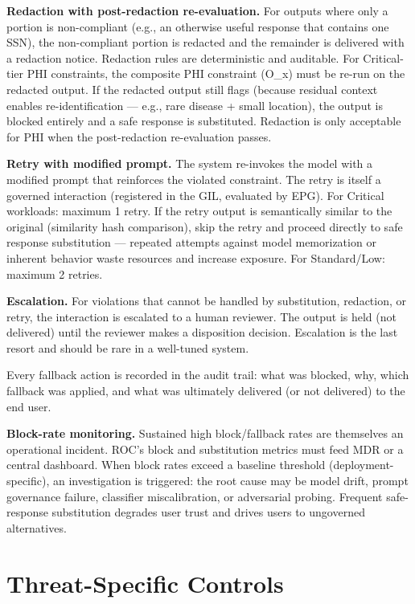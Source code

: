 \textbf{Redaction with post-redaction re-evaluation.} For outputs where only a portion is non-compliant (e.g., an otherwise useful response that contains one SSN), the non-compliant portion is redacted and the remainder is delivered with a redaction notice. Redaction rules are deterministic and auditable. For Critical-tier PHI constraints, the composite PHI constraint (O\_\allowbreak{}x) must be re-run on the redacted output. If the redacted output still flags (because residual context enables re-identification --- e.g., rare disease + small location), the output is blocked entirely and a safe response is substituted. Redaction is only acceptable for PHI when the post-redaction re-evaluation passes.

\textbf{Retry with modified prompt.} The system re-invokes the model with a modified prompt that reinforces the violated constraint. The retry is itself a governed interaction (registered in the GIL, evaluated by EPG). For Critical workloads: maximum 1 retry. If the retry output is semantically similar to the original (similarity hash comparison), skip the retry and proceed directly to safe response substitution --- repeated attempts against model memorization or inherent behavior waste resources and increase exposure. For Standard/Low: maximum 2 retries.

\textbf{Escalation.} For violations that cannot be handled by substitution, redaction, or retry, the interaction is escalated to a human reviewer. The output is held (not delivered) until the reviewer makes a disposition decision. Escalation is the last resort and should be rare in a well-tuned system.

Every fallback action is recorded in the audit trail: what was blocked, why, which fallback was applied, and what was ultimately delivered (or not delivered) to the end user.

\textbf{Block-rate monitoring.} Sustained high block/fallback rates are themselves an operational incident. ROC's block and substitution metrics must feed MDR or a central dashboard. When block rates exceed a baseline threshold (deployment-specific), an investigation is triggered: the root cause may be model drift, prompt governance failure, classifier miscalibration, or adversarial probing. Frequent safe-response substitution degrades user trust and drives users to ungoverned alternatives.



\section{Threat-Specific Controls}
\label{sec:controls-6}



